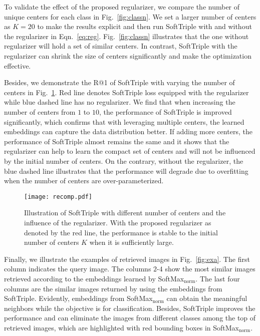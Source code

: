 \documentclass[10pt,twocolumn,letterpaper]{article}
\begin{document}
To validate the effect of the proposed regularizer, we compare the number of unique centers for each class in Fig.~\ref{fig:classn}. We set a larger number of centers as $K=20$ to make the results explicit and then run SoftTriple with and without the regularizer in Eqn.~\ref{eq:reg}. Fig.~\ref{fig:classn} illustrates that the one without regularizer will hold a set of similar centers. In contrast, SoftTriple with the regularizer can shrink the size of centers significantly and make the optimization effective. 

Besides, we demonstrate the R@1 of SoftTriple with varying the number of centers in Fig.~\ref{fig:recall}. Red line denotes SoftTriple loss equipped with the regularizer while blue dashed line has no regularizer. We find that when increasing the number of centers from $1$ to $10$, the performance of SoftTriple is improved significantly, which confirms that with leveraging multiple centers, the learned embeddings can capture the data distribution better. If adding more centers, the performance of SoftTriple almost remains the same and it shows that the regularizer can help to learn the compact set of centers and will not be influenced by the initial number of centers. On the contrary, without the regularizer, the blue dashed line illustrates that the performance will degrade due to overfitting when the number of centers are over-parameterized.

\begin{figure}[!ht]
\centering
\texttt{[image: recomp.pdf]}
\caption{Illustration of SoftTriple with different number of centers and the influence of the regularizer. With the proposed regularizer as denoted by the red line, the performance is stable to the initial number of centers $K$ when it is sufficiently large.\label{fig:recall}}
\end{figure}

Finally, we illustrate the examples of retrieved images in Fig.~\ref{fig:exa}. The first column indicates the query image. The columns $2$-$4$ show the most similar images retrieved according to the embeddings learned by SoftMax$_\mathrm{norm}$. The last four columns are the similar images returned by using the embeddings from SoftTriple. Evidently, embeddings from SoftMax$_\mathrm{norm}$ can obtain the meaningful neighbors while the objective is for classification. Besides, SoftTriple improves the performance and can eliminate the images from different classes among the top of retrieved images, which are highlighted with red bounding boxes in SoftMax$_\mathrm{norm}$.
\end{document}
